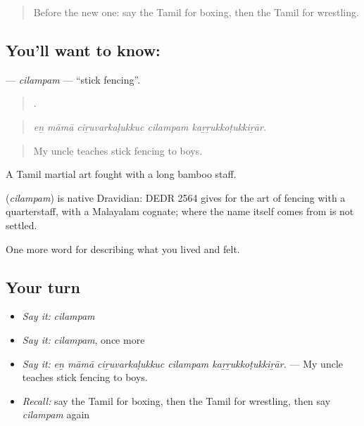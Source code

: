\label{lesson:TA-C532-cilampam}



\begin{quote}
Before the new one: say the Tamil for boxing, then the Tamil for wrestling.
\end{quote}

\subsection*{You'll want to know: }
\textbf{} — \emph{cilampam} — \textquotedblleft{}stick fencing\textquotedblright{}.

\begin{quote}
    .
\end{quote}

\begin{quote}
\emph{eṉ māmā ciṟuvarkaḷukkuc cilampam kaṟṟukkoṭukkiṟār.}
\end{quote}

\begin{quote}
My uncle teaches stick fencing to boys.
\end{quote}

A Tamil martial art fought with a long bamboo staff.

\begin{cousinweb}
\textbf{} (\emph{cilampam}) is native Dravidian: DEDR 2564 gives  for the art of fencing with a quarterstaff, with a Malayalam cognate; where the name itself comes from is not settled.
\end{cousinweb}

\begin{grammarlens}[title={What you've built}]
One more word for describing what you lived and felt.
\end{grammarlens}

\subsection*{Your turn}
\begin{itemize}
\raggedright
  \item \emph{Say it:} \emph{cilampam}
  \item \emph{Say it:} \emph{cilampam}, once more
  \item \emph{Say it:} \emph{eṉ māmā ciṟuvarkaḷukkuc cilampam kaṟṟukkoṭukkiṟār.} — My uncle teaches stick fencing to boys.
  \item \emph{Recall:} say the Tamil for boxing, then the Tamil for wrestling, then say \emph{cilampam} again
\end{itemize}

